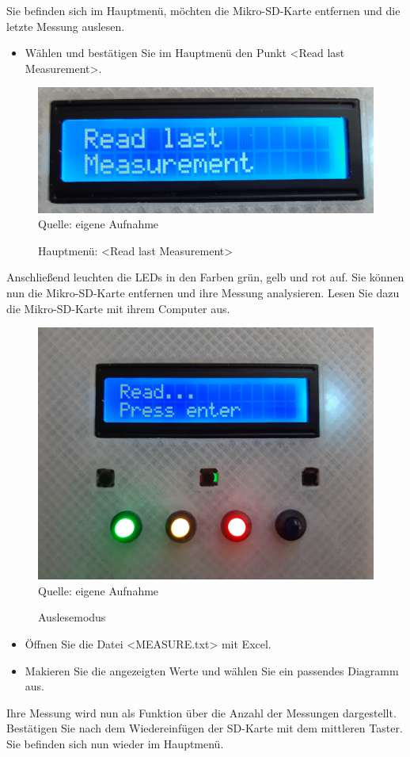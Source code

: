 \label{Auswertung}

Sie befinden sich im Hauptmenü, möchten die Mikro-SD-Karte entfernen und die letzte Messung auslesen.
\begin{itemize}
	\item Wählen und bestätigen Sie im Hauptmenü den Punkt <Read last Measurement>. 
\end{itemize}

\begin{figure}[!hbt]
	\centering
	\includegraphics[width=0.3\linewidth]{Images/ReadLastMeasurement2}
	\footnotesize \\Quelle: eigene Aufnahme
	\caption{Hauptmenü: <Read last Measurement>}
	\label{fig:Readlast}
\end{figure}

Anschließend leuchten die \ac{LED}s in den Farben grün, gelb und rot auf. Sie können nun die Mikro-SD-Karte entfernen und ihre Messung analysieren. Lesen Sie dazu die Mikro-SD-Karte mit ihrem Computer aus.

\begin{figure}[!hbt]
	\centering
	\includegraphics[width=0.3\linewidth]{Images/Read}
	\footnotesize \\Quelle: eigene Aufnahme
	\caption{Auslesemodus}
	\label{fig:Read}
\end{figure}
 
\begin{itemize}
	\item Öffnen Sie die Datei <MEASURE.txt> mit Excel.
	\item Makieren Sie die angezeigten Werte und wählen Sie ein passendes Diagramm aus.
\end{itemize}
Ihre Messung wird nun als Funktion über die Anzahl der Messungen dargestellt. Bestätigen Sie nach dem Wiedereinfügen der SD-Karte mit dem mittleren Taster. Sie befinden sich nun wieder im Hauptmenü.
